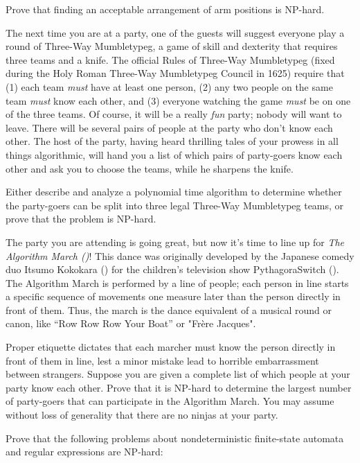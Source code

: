 \begin{exercises}
Prove that finding an acceptable arrangement of arm positions is NP-hard.

\item The next time you are at a party, one of the guests will suggest everyone play a round of Three-Way Mumbletypeg, a game of skill and dexterity that requires three teams and a knife. The official Rules of Three-Way Mumbletypeg (fixed during the Holy Roman Three-Way Mumbletypeg Council in 1625) require that (1) each team \textit{must} have at least one person, (2) any two people on the same team \textit{must} know each other, and (3) everyone watching the game \textit{must} be on one of the three teams. Of course, it will be a really \textit{fun} party; nobody will want to leave. There will be several pairs of people at the party who don’t know each other. The host of the party, having heard thrilling tales of your prowess in all things algorithmic, will hand you a list of which pairs of party-goers know each other and ask you to choose the teams, while he sharpens the knife.

Either describe and analyze a polynomial time algorithm to determine whether the party-goers can be split into three legal Three-Way Mumbletypeg teams, or prove that the problem is NP-hard.

\item The party you are attending is going great, but now it’s time to line up for \textit{The Algorithm March (\textit{})}! This dance was originally developed by the Japanese comedy duo Itsumo Kokokara () for the children’s television show PythagoraSwitch (). The Algorithm March is performed by a line of people; each person in line starts a specific sequence of movements one measure later than the person directly in front of them. Thus, the march is the dance equivalent of a musical round or canon, like “Row Row Row Your Boat” or "Frère Jacques".

Proper etiquette dictates that each marcher must know the person directly in front of them in line, lest a minor mistake lead to horrible embarrassment between strangers. Suppose you are given a complete list of which people at your party know each other. Prove that it is NP-hard to determine the largest number of party-goers that can participate in the Algorithm March. You may assume without loss of generality that there are no ninjas at your party.

\item {} Prove that the following problems about nondeterministic finite-state automata and regular expressions are NP-hard:


\end{exercises}
